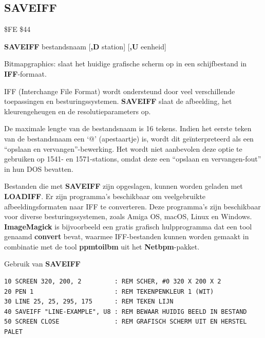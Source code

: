 
\newpage
\subsection{SAVEIFF}
\begin{description}[leftmargin=2cm,style=nextline]
\item [Token:]    \$FE \$44

\item [Formaat:]   {\bf SAVEIFF} bestandsnaam [{\bf,D} station] [{\bf,U} eenheid]

\item [Gebruik:]    Bitmapgraphics: slaat het huidige grafische scherm op in een schijfbestand in {\bf IFF}-formaat.

                  IFF (Interchange File Format) wordt ondersteund door veel verschillende toepassingen en besturingssystemen. {\bf SAVEIFF} slaat de afbeelding, het kleurengeheugen en de resolutieparameters op.

                  \filenamedefinition De maximale lengte van de bestandsnaam is 16 tekens. Indien het eerste teken van de bestandsnaam een `@' (apestaartje) is, wordt dit geïnterpreteerd als een ``opslaan en vervangen''-bewerking. Het wordt niet aanbevolen deze optie te gebruiken op 1541- en 1571-stations, omdat deze een ``opslaan en vervangen-fout'' in hun DOS bevatten.

                  \drivedefinition

                  \unitdefinition

\item [Opmerkingen:]  Bestanden die met {\bf SAVEIFF} zijn opgeslagen, kunnen worden geladen met {\bf LOADIFF}. Er zijn programma's beschikbaar om veelgebruikte afbeeldingsformaten naar IFF te converteren. Deze programma's zijn beschikbaar voor diverse besturingssystemen, zoals Amiga OS, macOS, Linux en Windows. {\bf ImageMagick} is bijvoorbeeld een gratis grafisch hulpprogramma dat een tool genaamd {\bf convert} bevat, waarmee IFF-bestanden kunnen worden gemaakt in combinatie met de tool {\bf ppmtoilbm} uit het {\bf Netbpm}-pakket.

\item [Voorbeeld:]  Gebruik van {\bf SAVEIFF}

\begin{tcolorbox}[colback=black,coltext=white]
\verbatimfont{\codefont}
\begin{verbatim}
10 SCREEN 320, 200, 2         : REM SCHER, #0 320 X 200 X 2
20 PEN 1                      : REM TEKENPENKLEUR 1 (WIT)
30 LINE 25, 25, 295, 175      : REM TEKEN LIJN
40 SAVEIFF "LINE-EXAMPLE", U8 : REM BEWAAR HUIDIG BEELD IN BESTAND
50 SCREEN CLOSE               : REM GRAFISCH SCHERM UIT EN HERSTEL PALET
\end{verbatim}
\end{tcolorbox}
\end{description}

